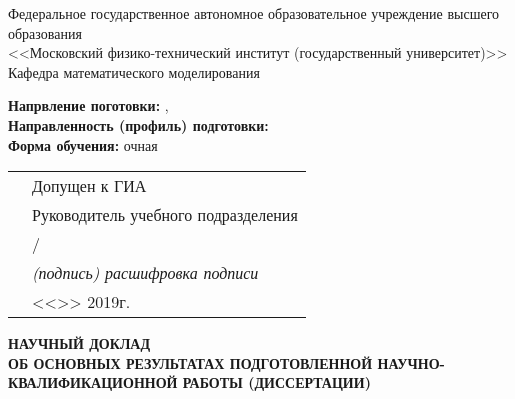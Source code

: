 \thispagestyle{empty}
\begin{center}
Федеральное государственное автономное образовательное учреждение высшего
образования \\
<<Московский физико-технический институт (государственный университет)>> \\
Кафедра математического моделирования \\
\end{center}

\vspace{0pt plus1fill}
\begin{small}
\begin{flushleft}
\textbf {Напрвление поготовки:} \thesisSpecialtyNumber, \thesisSpecialtyTitle \\
\textbf {Направленность (профиль) подготовки:} \thesisSpecialtyTwoTitle \\
\textbf {Форма обучения:} очная
\end{flushleft}

\begin{flushright}
  \begin{tabularx}{\textwidth}{XX}
    &Допущен к ГИА \\
    &Руководитель учебного подразделения \\
    &\underline{\hspace{3cm}}/\underline{\hspace{4cm}} \\
    &\hspace{1cm}\textit {(подпись) расшифровка подписи} \\
    & <<\underline {\hspace{1cm}}>> \underline {\hspace{3cm}} 2019г.
  \end{tabularx}
\end{flushright}

\vspace{0pt plus3fill}
\begin{center}
\textbf {НАУЧНЫЙ ДОКЛАД} \\
\textbf {ОБ ОСНОВНЫХ РЕЗУЛЬТАТАХ ПОДГОТОВЛЕННОЙ НАУЧНО-КВАЛИФИКАЦИОННОЙ РАБОТЫ (ДИССЕРТАЦИИ)}

\vspace{0pt plus2fill}

\textbf {\thesisTitle}
\end{center}


\end{small}
